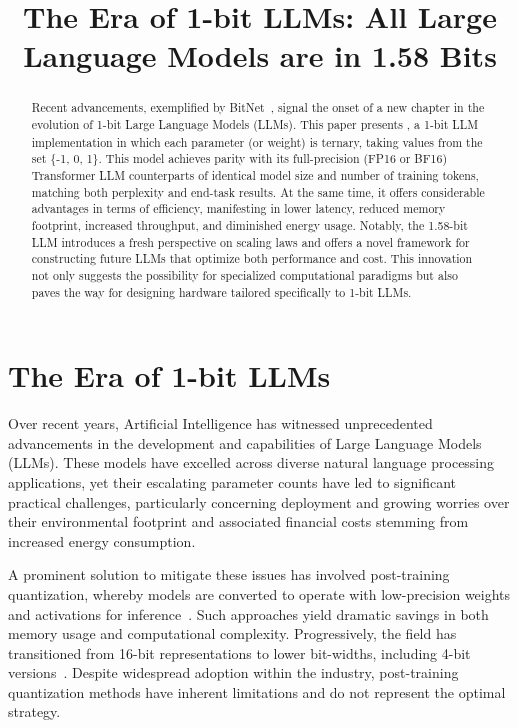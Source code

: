 \title{The Era of 1-bit LLMs: All Large Language Models are in 1.58 Bits}

\begin{abstract}
Recent advancements, exemplified by BitNet~\cite{bitnet}, signal the onset of a new chapter in the evolution of 1-bit Large Language Models (LLMs). This paper presents \textbf{}, a 1-bit LLM implementation in which each parameter (or weight) is ternary, taking values from the set \{-1, 0, 1\}. This model achieves parity with its full-precision (FP16 or BF16) Transformer LLM counterparts of identical model size and number of training tokens, matching both perplexity and end-task results. At the same time, it offers considerable advantages in terms of efficiency, manifesting in lower latency, reduced memory footprint, increased throughput, and diminished energy usage. Notably, the 1.58-bit LLM introduces a fresh perspective on scaling laws and offers a novel framework for constructing future LLMs that optimize both performance and cost. This innovation not only suggests the possibility for specialized computational paradigms but also paves the way for designing hardware tailored specifically to 1-bit LLMs.
\end{abstract}

\section{The Era of 1-bit LLMs}

Over recent years, Artificial Intelligence has witnessed unprecedented advancements in the development and capabilities of Large Language Models (LLMs). These models have excelled across diverse natural language processing applications, yet their escalating parameter counts have led to significant practical challenges, particularly concerning deployment and growing worries over their environmental footprint and associated financial costs stemming from increased energy consumption.

A prominent solution to mitigate these issues has involved post-training quantization, whereby models are converted to operate with low-precision weights and activations for inference~\cite{smoothquant, gptq, quip, quip_sharp}. Such approaches yield dramatic savings in both memory usage and computational complexity. Progressively, the field has transitioned from 16-bit representations to lower bit-widths, including 4-bit versions~\cite{gptq, awq}. Despite widespread adoption within the industry, post-training quantization methods have inherent limitations and do not represent the optimal strategy.

